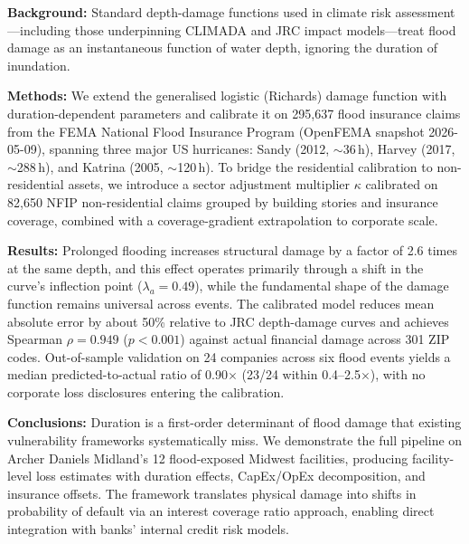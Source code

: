 \textbf{Background:} Standard depth-damage functions used in climate risk assessment---including those underpinning CLIMADA and JRC impact models---treat flood damage as an instantaneous function of water depth, ignoring the duration of inundation.

\textbf{Methods:} We extend the generalised logistic (Richards) damage function with duration-dependent parameters and calibrate it on 295{,}637 flood insurance claims from the FEMA National Flood Insurance Program (OpenFEMA snapshot 2026-05-09), spanning three major US hurricanes: Sandy (2012, $\sim$36\,h), Harvey (2017, $\sim$288\,h), and Katrina (2005, $\sim$120\,h). To bridge the residential calibration to non-residential assets, we introduce a sector adjustment multiplier $\kappa$ calibrated on 82{,}650 NFIP non-residential claims grouped by building stories and insurance coverage, combined with a coverage-gradient extrapolation to corporate scale.

\textbf{Results:} Prolonged flooding increases structural damage by a factor of 2.6 times at the same depth, and this effect operates primarily through a shift in the curve's inflection point ($\lambda_a = 0.49$), while the fundamental shape of the damage function remains universal across events. The calibrated model reduces mean absolute error by about 50\% relative to JRC depth-damage curves and achieves Spearman $\rho = 0.949$ ($p < 0.001$) against actual financial damage across 301 ZIP codes. Out-of-sample validation on 24 companies across six flood events yields a median predicted-to-actual ratio of 0.90$\times$ (23/24 within 0.4--2.5$\times$), with no corporate loss disclosures entering the calibration.

\textbf{Conclusions:} Duration is a first-order determinant of flood damage that existing vulnerability frameworks systematically miss. We demonstrate the full pipeline on Archer Daniels Midland's 12 flood-exposed Midwest facilities, producing facility-level loss estimates with duration effects, CapEx/OpEx decomposition, and insurance offsets. The framework translates physical damage into shifts in probability of default via an interest coverage ratio approach, enabling direct integration with banks' internal credit risk models.
